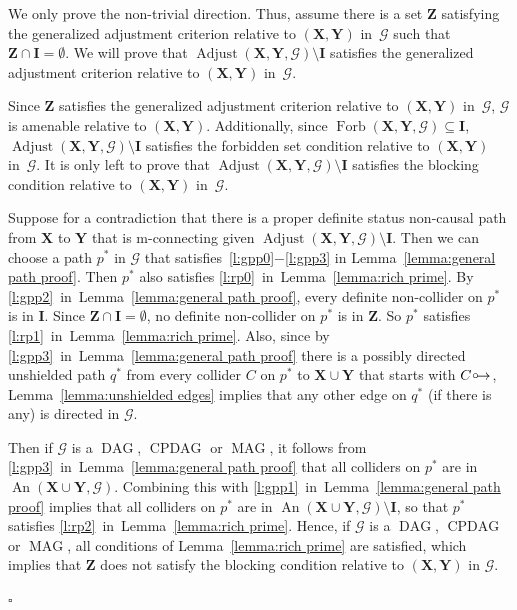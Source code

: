 \documentclass[11pt,a4paper]{article}
\newenvironment{proofof}[1][]{\begin{trivlist}
   \item[\hskip \labelsep {\bfseries Proof of #1.}]}{\hfill{}$\square$\end{trivlist}}
\DeclareMathOperator{\CPDAG}{CPDAG}
\DeclareMathOperator{\DAG}{DAG}
\DeclareMathOperator{\MAG}{MAG}
\DeclareMathOperator{\An}{An}
\DeclareMathOperator{\Adjust}{Adjust}
\DeclareMathOperator{\Forbi}{Forb}
\newcommand{\forb}{the forbidden set condition\xspace}
\newcommand{\blck}{the blocking condition\xspace}
\newcommand{\g}[1][G]{\mathcal{#1}}
\newcommand{\adjustb}[2][X,Y]{\Adjust(\mathbf{#1},#2)}
\newcommand{\fb}[2][X,Y]{\Forbi(\mathbf{#1},#2)}%
\newcommand{\pstar}[1][p]{{#1}^{*}}
\newcommand{\circarrow}{
  \setlength{\unitlength}{1mm}
  \begin{picture}(5,1)(0,0)
    \put(1,1){\circle{1}}
    \put(1.2,0){$\rightarrow$}
  \end{picture}
}
\begin{document}
\begin{proofof}[Theorem~\ref{theorem:general set proof}]
We only prove the non-trivial direction. Thus, assume there is a set $\mathbf{Z}$ satisfying the generalized adjustment criterion relative to $(\mathbf{X,Y})$ in~$\g$ such that $\mathbf{Z} \cap \mathbf{I} = \emptyset$. We will prove that $\adjustb{\g} \setminus \mathbf{I}$ satisfies the generalized adjustment criterion relative to $(\mathbf{X,Y})$ in~$\g$.

Since $\mathbf{Z}$ satisfies the generalized adjustment criterion relative to $(\mathbf{X,Y})$ in~$\g$, $\g$ is amenable relative to $(\mathbf{X,Y})$. Additionally, since $\fb{\g} \subseteq \mathbf{I}$, $\adjustb{\g} \setminus \mathbf{I}$ satisfies \forb{} relative to $(\mathbf{X,Y})$ in~$\g$. It is only left to prove that $\adjustb{\g} \setminus \mathbf{I}$ satisfies \blck{} relative to $(\mathbf{X,Y})$ in~$\g$.

Suppose for a contradiction that there is a proper definite status non-causal path from $\mathbf{X}$ to $\mathbf{Y}$ that is m-connecting given $\adjustb{\g} \setminus \mathbf{I}$.
Then we can choose a path $\pstar$ in $\g$ that satisfies~\ref{l:gpp0}$-$\ref{l:gpp3} in Lemma~\ref{lemma:general path proof}. Then $\pstar$ also satisfies \ref{l:rp0}~in~Lemma~\ref{lemma:rich prime}.
By \ref{l:gpp2}~in~Lemma~\ref{lemma:general path proof}, every definite non-collider on $\pstar$ is in $\mathbf{I}$. Since $\mathbf{Z} \cap \mathbf{I} = \emptyset$, no definite non-collider on $\pstar$ is in $\mathbf{Z}$. So $\pstar$ satisfies \ref{l:rp1}~in~Lemma~\ref{lemma:rich prime}. Also, since by \ref{l:gpp3}~in~Lemma~\ref{lemma:general path proof} there is a possibly directed unshielded path $\pstar[q]$ from every collider $C$ on $\pstar$ to $\mathbf{X} \cup \mathbf{Y}$ that starts with $C \circarrow$, Lemma~\ref{lemma:unshielded edges} implies that any other edge on $\pstar[q]$ (if there is any) is directed in $\g$.

Then if $\g$ is a $\DAG$, $\CPDAG$ or $\MAG$, it follows from \ref{l:gpp3}~in~Lemma~\ref{lemma:general path proof} that all colliders on $\pstar$ are in $\An(\mathbf{X} \cup \mathbf{Y},\g)$. Combining this with \ref{l:gpp1}~in~Lemma~\ref{lemma:general path proof} implies that all colliders on $\pstar$ are in $\An(\mathbf{X} \cup \mathbf{Y},\g) \setminus \mathbf{I}$, so that $\pstar$ satisfies \ref{l:rp2}~in~Lemma~\ref{lemma:rich prime}. Hence, if $\g$ is a $\DAG$, $\CPDAG$ or $\MAG$, all conditions of Lemma~\ref{lemma:rich prime} are satisfied, which implies that $\mathbf{Z}$ does not satisfy \blck{} relative to $(\mathbf{X,Y})$ in $\g$.


\end{proofof}
\end{document}
